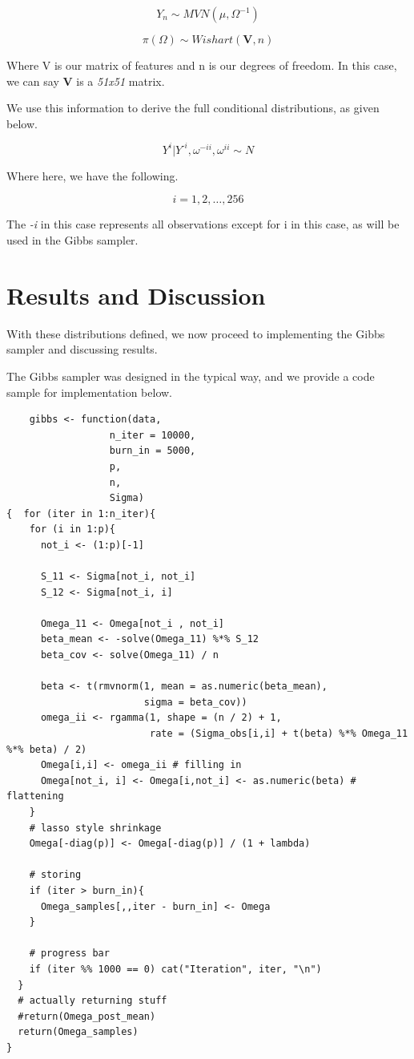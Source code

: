 \documentclass{article}
\begin{document}
\begin{equation}
    Y_n \sim MVN(\mu, \Omega^{-1})
\end{equation}

\begin{equation}
    \pi(\Omega) \sim Wishart(\textbf{V}, n)
\end{equation}

Where V is our matrix of features and n is our degrees of freedom. In this case, we can say \textbf{V} is a \textit{51x51} matrix. 

We use this information to derive the full conditional distributions, as given below. 

\begin{equation}
    Y^\textit{i} | Y^\textit{-i} , \omega^{-ii}, \omega^{ii} \sim N 
\end{equation}

Where here, we have the following. 

\begin{equation}
    \textit{i} = 1, 2, \dots, 256
\end{equation} 

The \textit{-i} in this case represents all observations except for i in this case, as will be used in the Gibbs sampler. 

\section{Results and Discussion}
\label{headings}

With these distributions defined, we now proceed to implementing the Gibbs sampler and discussing results. 

The Gibbs sampler was designed in the typical way, and we provide a code sample for implementation below. 

\begin{verbatim}
    gibbs <- function(data,
                  n_iter = 10000, 
                  burn_in = 5000,
                  p, 
                  n,
                  Sigma)
{  for (iter in 1:n_iter){
    for (i in 1:p){
      not_i <- (1:p)[-1]
      
      S_11 <- Sigma[not_i, not_i]
      S_12 <- Sigma[not_i, i]
      
      Omega_11 <- Omega[not_i , not_i]
      beta_mean <- -solve(Omega_11) %*% S_12
      beta_cov <- solve(Omega_11) / n
      
      beta <- t(rmvnorm(1, mean = as.numeric(beta_mean),
                        sigma = beta_cov))
      omega_ii <- rgamma(1, shape = (n / 2) + 1, 
                         rate = (Sigma_obs[i,i] + t(beta) %*% Omega_11 %*% beta) / 2)
      Omega[i,i] <- omega_ii # filling in 
      Omega[not_i, i] <- Omega[i,not_i] <- as.numeric(beta) # flattening
    }
    # lasso style shrinkage 
    Omega[-diag(p)] <- Omega[-diag(p)] / (1 + lambda)
    
    # storing 
    if (iter > burn_in){
      Omega_samples[,,iter - burn_in] <- Omega
    }
    
    # progress bar
    if (iter %% 1000 == 0) cat("Iteration", iter, "\n")
  }
  # actually returning stuff 
  #return(Omega_post_mean)
  return(Omega_samples)
}
\end{verbatim}
\pagebreak
\end{document}
